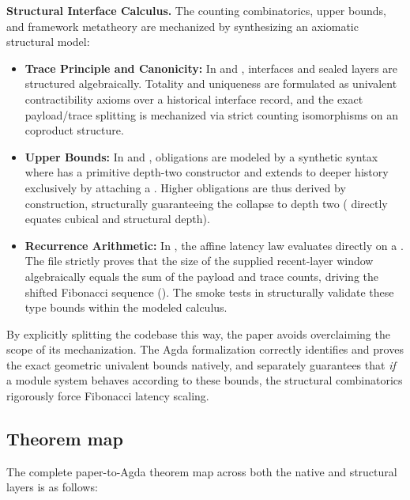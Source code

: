 \documentclass{lmcs}
\begin{document}
\textbf{Structural Interface Calculus.}
The counting combinatorics, upper bounds, and framework metatheory are mechanized by synthesizing an axiomatic structural model:
\begin{itemize}
    \item \textbf{Trace Principle and Canonicity:} In  and , interfaces and sealed layers are structured algebraically. Totality and uniqueness are formulated as univalent contractibility axioms over a historical interface record, and the exact payload/trace splitting is mechanized via strict counting isomorphisms on an  coproduct structure.
    \item \textbf{Upper Bounds:} In  and , obligations are modeled by a synthetic syntax where  has a primitive depth-two constructor and extends to deeper history exclusively by attaching a . Higher obligations are thus derived by construction, structurally guaranteeing the collapse to depth two ( directly equates cubical and structural depth).
    \item \textbf{Recurrence Arithmetic:} In , the affine latency law evaluates directly on a . The file strictly proves that the size of the supplied recent-layer window algebraically equals the sum of the payload and trace counts, driving the shifted Fibonacci sequence (). The smoke tests in  structurally validate these type bounds within the modeled calculus.
\end{itemize}

By explicitly splitting the codebase this way, the paper avoids overclaiming the scope of its mechanization. The Agda formalization correctly identifies and proves the exact geometric univalent bounds natively, and separately guarantees that \emph{if} a module system behaves according to these bounds, the structural combinatorics rigorously force Fibonacci latency scaling.

\subsection{Theorem map}

The complete paper-to-Agda theorem map across both the native and structural layers is as follows:
\end{document}
